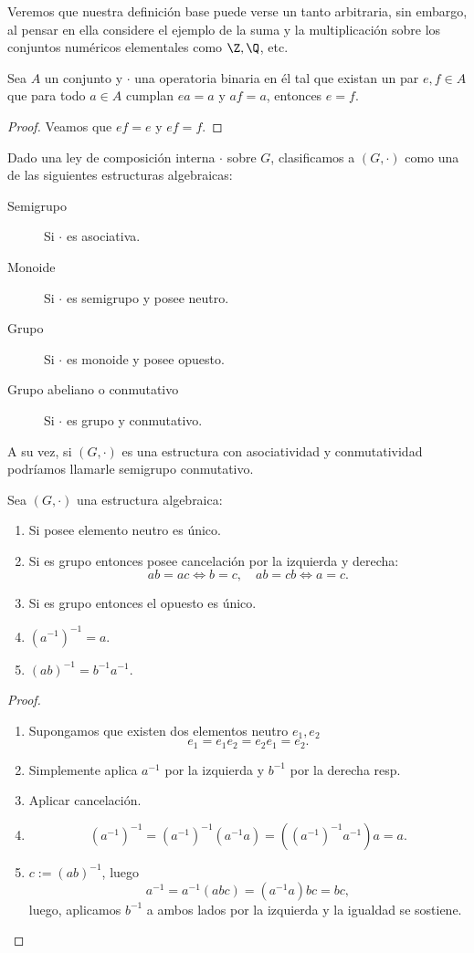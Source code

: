 \documentclass[11pt,oneside]{book}
\begin{document}
Veremos que nuestra definición base puede verse un tanto arbitraria, sin embargo, al pensar en ella considere el ejemplo de la suma y la multiplicación sobre los conjuntos numéricos elementales como $\Z,\Q$, etc.
\begin{lem}\label{thm:unique-neutral-element}
Sea $A$ un conjunto y $\cdot$ una operatoria binaria en él tal que existan un par $e,f\in A$ que para todo $a\in A$ cumplan $ea=a$ y $af=a$, entonces $e=f$.
\end{lem}
\begin{proof}
Veamos que $ef=e$ y $ef=f$.
\end{proof}
\begin{mydef}
Dado una ley de composición interna $\cdot$ sobre $G$, clasificamos a $(G,\cdot)$ como una de las siguientes estructuras algebraicas:
\begin{description}
	\item[Semigrupo] Si $\cdot$ es asociativa.
	\item[Monoide] Si $\cdot$ es semigrupo y posee neutro.
	\item[Grupo] Si $\cdot$ es monoide y posee opuesto.
	\item[Grupo abeliano o conmutativo] Si $\cdot$ es grupo y conmutativo.
\end{description}
A su vez, si $(G,\cdot)$ es una estructura con asociatividad y conmutatividad podríamos llamarle semigrupo conmutativo.
\end{mydef}
\begin{thm}
Sea $(G,\cdot)$ una estructura algebraica:
\begin{enumerate}[$a)$]
	\item Si posee elemento neutro es único.
	\item Si es grupo entonces posee cancelación por la izquierda y derecha:
	$$ab=ac\iff b=c,\quad ab=cb\iff a=c.$$
	\item Si es grupo entonces el opuesto es único.
	\item $(a^{-1})^{-1}=a$.
	\item $(ab)^{-1}=b^{-1}a^{-1}$.
\end{enumerate}
\end{thm}
\begin{proof}
\begin{enumerate}[$a)$]
\item Supongamos que existen dos elementos neutro $e_1,e_2$
$$e_1=e_1e_2=e_2e_1=e_2.$$
\item Simplemente aplica $a^{-1}$ por la izquierda y $b^{-1}$ por la derecha resp.
\item Aplicar cancelación.
\item $$(a^{-1})^{-1}=(a^{-1})^{-1}(a^{-1}a)=((a^{-1})^{-1}a^{-1})a=a.$$
\item $c:=(ab)^{-1}$, luego
$$a^{-1}=a^{-1}(abc)=(a^{-1}a)bc=bc,$$
luego, aplicamos $b^{-1}$ a ambos lados por la izquierda y la igualdad se sostiene.
\end{enumerate}
\end{proof}
\end{document}

